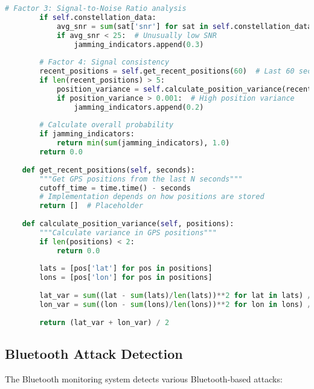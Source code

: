 \documentclass[12pt,a4paper]{report}
\begin{document}
\begin{lstlisting}[language=Python, caption=Enhanced GPS Jamming Detection]
        # Factor 3: Signal-to-Noise Ratio analysis
        if self.constellation_data:
            avg_snr = sum(sat['snr'] for sat in self.constellation_data.values()) / len(self.constellation_data)
            if avg_snr < 25:  # Unusually low SNR
                jamming_indicators.append(0.3)
                
        # Factor 4: Signal consistency
        recent_positions = self.get_recent_positions(60)  # Last 60 seconds
        if len(recent_positions) > 5:
            position_variance = self.calculate_position_variance(recent_positions)
            if position_variance > 0.001:  # High position variance
                jamming_indicators.append(0.2)
        
        # Calculate overall probability
        if jamming_indicators:
            return min(sum(jamming_indicators), 1.0)
        return 0.0
    
    def get_recent_positions(self, seconds):
        """Get GPS positions from the last N seconds"""
        cutoff_time = time.time() - seconds
        # Implementation depends on how positions are stored
        return []  # Placeholder
    
    def calculate_position_variance(self, positions):
        """Calculate variance in GPS positions"""
        if len(positions) < 2:
            return 0.0
            
        lats = [pos['lat'] for pos in positions]
        lons = [pos['lon'] for pos in positions]
        
        lat_var = sum((lat - sum(lats)/len(lats))**2 for lat in lats) / len(lats)
        lon_var = sum((lon - sum(lons)/len(lons))**2 for lon in lons) / len(lons)
        
        return (lat_var + lon_var) / 2
\end{lstlisting}

\subsection{Bluetooth Attack Detection}

The Bluetooth monitoring system detects various Bluetooth-based attacks:
\end{document}
